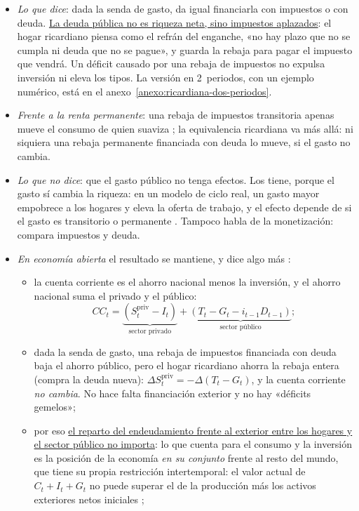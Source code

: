 \documentclass[11pt]{article}
\begin{document}
\begin{itemize}
\item \emph{Lo que dice}: dada la senda de gasto, da igual financiarla con impuestos o con deuda. \uline{La deuda pública no es riqueza neta, sino impuestos aplazados}: el hogar ricardiano piensa como el refrán del enganche, «no hay plazo que no se cumpla ni deuda que no se pague», y guarda la rebaja para pagar el impuesto que vendrá. Un déficit causado por una rebaja de impuestos no expulsa inversión ni eleva los tipos. La versión en 2~periodos, con un ejemplo numérico, está en el anexo~\ref{anexo:ricardiana-dos-periodos}.
\item \emph{Frente a la renta permanente}: una rebaja de impuestos transitoria apenas mueve el consumo de quien suaviza ; la equivalencia ricardiana va más allá: ni siquiera una rebaja permanente financiada con deuda lo mueve, si el gasto no cambia.
\item \emph{Lo que no dice}: que el gasto público no tenga efectos. Los tiene, porque el gasto sí cambia la riqueza: en un modelo de ciclo real, un gasto mayor empobrece a los hogares y eleva la oferta de trabajo\nocite{BaxterKing1993Fiscal}, y el efecto depende de si el gasto es transitorio o permanente . Tampoco habla de la monetización: compara impuestos y deuda.
\item \emph{En economía abierta} el resultado se mantiene, y dice algo más\nocite{UribeSchmittGrohe2017Open} :
  \begin{itemize}
  \item la cuenta corriente es el ahorro nacional menos la inversión, y el ahorro nacional suma el privado y el público:
    \begin{equation*}
    CC_t=\underbrace{(S^{\mathrm{priv}}_t-I_t)}_{\text{sector privado}}+\underbrace{(T_t-G_t-i_{t-1}D_{t-1})}_{\text{sector público}} ;
    \end{equation*}
  \item dada la senda de gasto, una rebaja de impuestos financiada con deuda baja el ahorro público, pero el hogar ricardiano ahorra la rebaja entera (compra la deuda nueva): $\Delta S^{\mathrm{priv}}_t=-\Delta(T_t-G_t)$, y la cuenta corriente \emph{no cambia}. No hace falta financiación exterior y no hay «déficits gemelos»;
  \item por eso \uline{el reparto del endeudamiento frente al exterior entre los hogares y el sector público no importa}: lo que cuenta para el consumo y la inversión es la posición de la economía \emph{en su conjunto} frente al resto del mundo, que tiene su propia restricción intertemporal: el valor actual de $C_t+I_t+G_t$ no puede superar el de la producción más los activos exteriores netos iniciales ;

\end{itemize}
\end{itemize}
\end{document}

